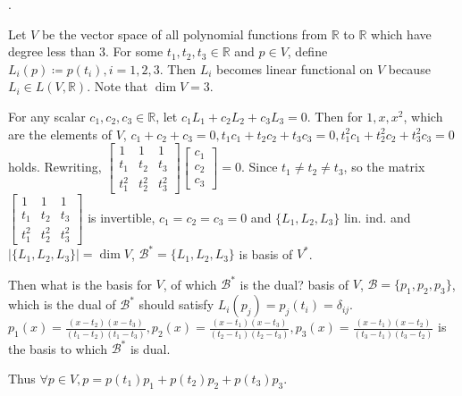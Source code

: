 \documentclass[8pt]{beamer}
\newcommand{\mbb}[1]{\mathbb{#1}}
\newcommand{\mc}[1]{\mathcal{#1}}
\begin{document}
\begin{frame}{.}
    \begin{example}
        Let $V$ be the vector space of all polynomial functions from $\mbb{R}$ to $\mbb{R}$ which have degree less than $3$.
        For some $t_1, t_2, t_3 \in \mbb{R}$ and $p \in V$, define $L_{i}(p) \coloneq p(t_i), i=1,2,3$.
        Then $L_i$ becomes linear functional on $V$ because $L_i \in L(V, \mbb{R})$.
        Note that $\dim V = 3$.

        \smallskip
        For any scalar $c_1, c_2, c_3 \in \mbb{R}$, let $c_1 L_1 + c_2 L_2 + c_3 L_3 = 0$.
        Then for $1, x, x^2$, which are the elements of $V$, $c_1 + c_2 + c_3 = 0, t_1 c_1 + t_2 c_2 + t_3 c_3 =0 , t_1^2 c_1 + t_2^2 c_2 + t_3 ^2 c_3 = 0$ holds.
        Rewriting, $\begin{bmatrix}
        1 & 1 & 1 \\ t_1 & t_2 & t_3 \\ t_1^2 & t_2^2 & t_3^2
        \end{bmatrix} \begin{bmatrix}
         c_1 \\ c_2 \\c_3
        \end{bmatrix} = 0$.
        Since $t_1 \neq t_2 \neq t_3$, so the matrix $\begin{bmatrix}
        1 & 1 & 1 \\ t_1 & t_2 & t_3 \\ t_1^2 & t_2^2 & t_3^2
        \end{bmatrix}$ is invertible, $c_1 = c_2 = c_3 = 0$ and $\{L_1, L_2, L_3\}$ lin. ind. and $| \{L_1, L_2, L_3 \}| = \dim V$, $\mc{B}^\ast = \{L_1, L_2, L_3\}$ is basis of $V^\ast$.

        Then what is the basis for $V$, of which $\mc{B}^\ast$ is the dual? basis of $V$, $\mc{B} = \{p_1, p_2, p_3\}$, which is the dual of $\mc{B}^\ast$ should satisfy $L_i(p_j) = p_j(t_i) = \delta_{ij}$.
        $p_1(x) = \frac{(x - t_2 )(x - t_3)}{(t_1 - t_2)(t_1 - t_3)}, p_2(x) = \frac{(x - t_1)(x - t_3)}{(t_2 - t_1)(t_2 - t_3)}, p_3(x) = \frac{(x - t_1)(x - t_2)}{(t_3 - t_1)(t_3 - t_2)}$ is the basis to which $\mc{B}^\ast$ is dual.

        \smallskip
        Thus $\forall p \in V, p = p(t_1)p_1 + p(t_2)p_2 + p(t_3)p_3$.
    \end{example}
\end{frame}
\end{document}

